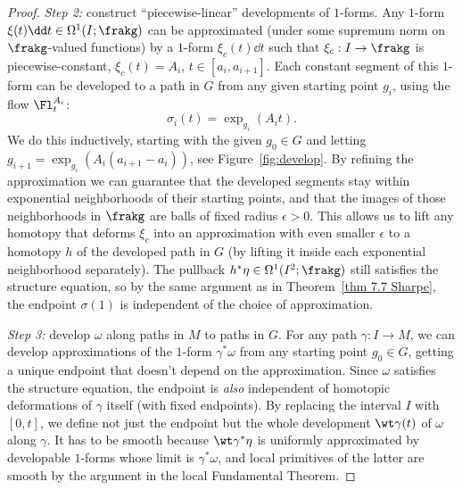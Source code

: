 \begin{proof}
    

    \emph{Step 2:} construct ``piecewise-linear'' developments of $1$-forms. Any $1$-form $\xi(t)\dd t\in\Omega^1(I;\frakg)$ can be approximated (under some supremum norm on $\frakg$-valued functions) by a $1$-form $\xi_c(t)\dd t$ such that $\xi_c:I\to \frakg$ is piecewise-constant, $\xi_c(t)=A_i$, $t\in[a_i,a_{i+1}]$. Each constant segment of this $1$-form can be developed to a path in $G$ from any given starting point $g_i$, using the flow $\Fl^{A_i}_t$:
    \[\sigma_i(t)=\exp_{g_i}(A_i t).\]
    We do this inductively, starting with the given $g_0\in G$ and letting $g_{i+1}=\exp_{g_i}(A_i (a_{i+1}-a_i))$, see Figure~\ref{fig:develop}. By refining the approximation we can guarantee that the developed segments stay within exponential neighborhoods of their starting points, and that the images of those neighborhoods in $\frakg$ are balls of fixed radius $\epsilon>0$. This allows us to lift any homotopy that deforms $\xi_c$ into an approximation with even smaller $\epsilon$ to a homotopy $h$ of the developed path in $G$ (by lifting it inside each exponential neighborhood separately). The pullback $h^\ast \eta\in \Omega^1(I^2;\frakg)$ still satisfies the structure equation, so by the same argument as in Theorem~\ref{thm 7.7 Sharpe}, the endpoint $\sigma(1)$ is independent of the choice of approximation.

    \emph{Step 3:} develop $\omega$ along paths in $M$ to paths in $G$. For any path $\gamma:I\to M$, we can develop approximations of the $1$-form $\gamma^\ast \omega$ from any starting point $g_0\in G$, getting a unique endpoint that doesn't depend on the approximation. Since $\omega$ satisfies the structure equation, the endpoint is \emph{also} independent of homotopic deformations of $\gamma$ itself (with fixed endpoints). By replacing the interval $I$ with $[0,t]$, we define not just the endpoint but the whole development $\wt\gamma(t)$ of $\omega$ along $\gamma$. It has to be smooth because $\wt\gamma^\ast \eta$ is uniformly approximated by developable $1$-forms whose limit is $\gamma^\ast\omega$, and local primitives of the latter are smooth by the argument in the local Fundamental Theorem.


\end{proof}
